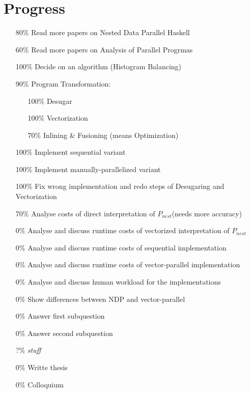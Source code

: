 \documentclass{article}
\newcommand{\ndpn}[0]{$P_{nest}$}
\newcommand{\note}[1]{{\tiny (#1)}}
\begin{document}
  \section{Progress}
    \begin{itemize}
      \item[80\%] Read more papers on Nested Data Parallel Haskell
      \item[60\%] Read more papers on Analysis of Parallel Progrmas
      \item[100\%] Decide on an algorithm (Histogram Balancing)
      \item[90\%] Program Transformation:
        \begin{itemize}
          \item[100\%] Desugar
          \item[100\%] Vectorization
          \item[70\%] Inlining \& Fusioning \note{means Optimization}
        \end{itemize}
      \item[100\%] Implement sequential variant
      \item[100\%] Implement manually-parallelized variant
      \item[100\%] Fix wrong implementation and redo steps of Desugaring and Vectorization
      \item[70\%] Analyse costs of direct interpretation of \ndpn \note{needs more accuracy}
      \item[0\%] Analyse and discuss runtime costs of vectorized interpretation of \ndpn
      \item[0\%] Analyse and discuss runtime costs of sequential implementation
      \item[0\%] Analyse and discuss runtime costs of vector-parallel implementation
      \item[0\%] Analyse and discuss human workload for the implementations
      \item[0\%] Show differences between NDP and vector-parallel
      \item[0\%] Answer first subquestion
      \item[0\%] Answer second subquestion
      \item[?\%] \textit{stuff}
      \item[0\%] Writte thesis
      \item[0\%] Colloquium
    \end{itemize}
    
  \newpage
    
\end{document}
